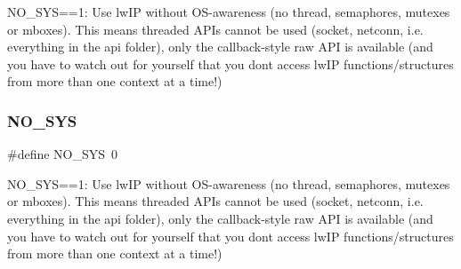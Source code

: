 N\+O\+\_\+\+S\+YS==1\+: Use lw\+IP without O\+S-\/awareness (no thread, semaphores, mutexes or mboxes). This means threaded A\+P\+Is cannot be used (socket, netconn, i.\+e. everything in the \textquotesingle{}api\textquotesingle{} folder), only the callback-\/style raw A\+PI is available (and you have to watch out for yourself that you don\textquotesingle{}t access lw\+IP functions/structures from more than one context at a time!) \mbox{\label{group__lwip__opts__nosys_gae00ba99de94a5bf84d832be8976df59b}} 
\subsubsection{\texorpdfstring{N\+O\+\_\+\+S\+YS}{NO\_SYS}\hspace{0.1cm}{\footnotesize\ttfamily [2/2]}}
{\footnotesize\ttfamily \#define N\+O\+\_\+\+S\+YS~0}

N\+O\+\_\+\+S\+YS==1\+: Use lw\+IP without O\+S-\/awareness (no thread, semaphores, mutexes or mboxes). This means threaded A\+P\+Is cannot be used (socket, netconn, i.\+e. everything in the \textquotesingle{}api\textquotesingle{} folder), only the callback-\/style raw A\+PI is available (and you have to watch out for yourself that you don\textquotesingle{}t access lw\+IP functions/structures from more than one context at a time!) 